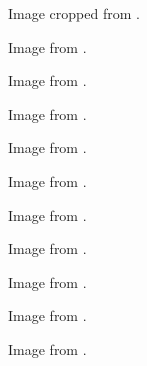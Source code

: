 	\begin{minipage}{\textwidth}
		Image cropped from \cite{subSandwich}.
	\end{minipage}

	\begin{minipage}{\textwidth}
		Image from \cite{hamburger}.
	\end{minipage}

	\begin{minipage}{\textwidth}
		Image from \cite{hotdog}.
	\end{minipage}

	\begin{minipage}{\textwidth}
		Image from \cite{iceCreamSandwich}.
	\end{minipage}

	\begin{minipage}{\textwidth}
		Image from \cite{burrito}.
	\end{minipage}

	\begin{minipage}{\textwidth}
		Image from \cite{taco}.
	\end{minipage}

	\begin{minipage}{\textwidth}
		Image from \cite{calzone}.
	\end{minipage}

	\begin{minipage}{\textwidth}
		Image from \cite{quesadilla}.
	\end{minipage}

	\begin{minipage}{\textwidth}
		Image from \cite{openFaced}.
	\end{minipage}

	\begin{minipage}{\textwidth}
		Image from \cite{pizza}.
	\end{minipage}

	\begin{minipage}{\textwidth}
		Image from \cite{pizzaSandwich}.
	\end{minipage}

